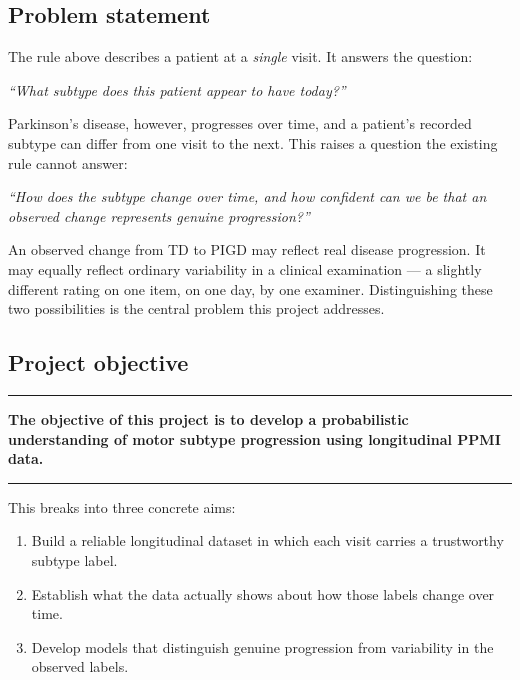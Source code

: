 \documentclass[11pt,a4paper]{article}
\newenvironment{keypoint}
  {\begin{center}\begin{minipage}{0.94\textwidth}%
   \vspace{4pt}\hrule\vspace{7pt}\small}
  {\vspace{7pt}\hrule\vspace{4pt}\end{minipage}\end{center}}
\begin{document}
\subsection{Problem statement}

The rule above describes a patient at a \emph{single} visit. It answers the
question:

\begin{center}
\emph{``What subtype does this patient appear to have today?''}
\end{center}

Parkinson's disease, however, progresses over time, and a patient's recorded
subtype can differ from one visit to the next. This raises a question the
existing rule cannot answer:

\begin{center}
\emph{``How does the subtype change over time, and how confident can we be that
an observed change represents genuine progression?''}
\end{center}

An observed change from TD to PIGD may reflect real disease progression. It may
equally reflect ordinary variability in a clinical examination --- a slightly
different rating on one item, on one day, by one examiner. Distinguishing these
two possibilities is the central problem this project addresses.

\subsection{Project objective}

\begin{keypoint}
\textbf{The objective of this project is to develop a probabilistic
understanding of motor subtype progression using longitudinal PPMI data.}
\end{keypoint}

\noindent
This breaks into three concrete aims:

\begin{enumerate}
  \item Build a reliable longitudinal dataset in which each visit carries a
        trustworthy subtype label.
  \item Establish what the data actually shows about how those labels change
        over time.
  \item Develop models that distinguish genuine progression from variability in
        the observed labels.
\end{enumerate}
\end{document}
